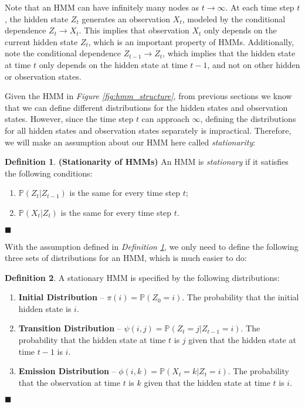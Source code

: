 \documentclass{article}
\theoremstyle{definition}
\newtheorem{definition}{Definition}
\newenvironment{definitionqed}
    {\begin{definition}}
    {\hfill \qedsymbol \end{definition}}
\renewcommand{\qedsymbol}{\(\blacksquare\)}
\renewcommand{\P}{\mathbb{P}}
\begin{document}
Note that an HMM can have infinitely many nodes as \(t \to \infty\). At each time step \(t\), the hidden state \(Z_t\) generates an observation \(X_t\), modeled by the conditional dependence \(Z_t \longrightarrow X_t\). This implies that observation \(X_t\) only depends on the current hidden state \(Z_t\), which is an important property of HMMs. Additionally, note the conditional dependence \(Z_{t-1} \longrightarrow Z_t\), which implies that the hidden state at time \(t\) only depends on the hidden state at time \(t-1\), and not on other hidden or observation states.

Given the HMM in \textit{Figure \ref{fig:hmm_structure}}, from previous sections we know that we can define different distributions for the hidden states and observation states. However, since the time step \(t\) can approach \(\infty\), defining the distributions for all hidden states and observation states separately is impractical. Therefore, we will make an assumption about our HMM here called \textit{stationarity}:

\begin{definitionqed} \label{def:stationarity}
    \textbf{(Stationarity of HMMs)} An HMM is \textit{stationary} if it satisfies the following conditions:
    \begin{enumerate}
        \item \(\P(Z_t | Z_{t-1})\) is the same for every time step \(t\);
        \item \(\P(X_t | Z_t)\) is the same for every time step \(t\).
    \end{enumerate}
\end{definitionqed}

With the assumption defined in \textit{Definition \ref{def:stationarity}}, we only need to define the following three sets of distributions for an HMM, which is much easier to do:

\begin{definitionqed} \label{def:hmm}
    A stationary HMM is specified by the following distributions:
    \begin{enumerate}
        \item \textbf{Initial Distribution} -- \(\pi(i) = \P(Z_0 = i)\). The probability that the initial hidden state is \(i\).
        \item \textbf{Transition Distribution} -- \(\psi(i, j) = \P(Z_t = j | Z_{t-1} = i)\). The probability that the hidden state at time \(t\) is \(j\) given that the hidden state at time \(t-1\) is \(i\).
        \item \textbf{Emission Distribution} -- \(\phi(i, k) = \P(X_t = k | Z_t = i)\). The probability that the observation at time \(t\) is \(k\) given that the hidden state at time \(t\) is \(i\).
    \end{enumerate}
\end{definitionqed}
\end{document}
